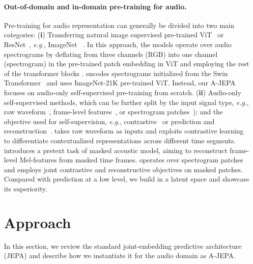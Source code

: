 \documentclass{article}
\begin{document}
\paragraph{Out-of-domain and in-domain pre-training for audio.} 
Pre-training for audio representation can generally be divided into two main categories: 
(\textbf{i}) Transferring natural image supervised pre-trained ViT~\cite{dosovitskiy2020image} or ResNet~\cite{He2015DeepRL}, \emph{e.g.}, ImageNet ~\cite{gong2021ast,paast,Nagrani21c,chen2022hts,gong2021psla,cmkd}. 
In this approach, the models operate over audio spectrograms by deflating from three channels (RGB) into one channel (spectrogram) in the pre-trained patch embedding in ViT and employing the rest of the transformer blocks \cite{gong2021ast,paast}. 
\cite{chen2022hts} encodes spectrograms initialized from the Swin Transformer~\cite{swin} and 
\cite{Nagrani21c} uses ImageNet-21K pre-trained ViT. 
Instead, our A-JEPA focuses on audio-only self-supervised pre-training from scratch. 
(\textbf{ii}) Audio-only self-supervised methods, which can be further split by the input signal type, \emph{e.g.}, raw waveform~\cite{wav2vec,wav2vec2,d2v}, frame-level features~\cite{Hsu2021HuBERTSS,avhubert,srivastava2021conformer}, or spectrogram patches~\cite{ssast,baade2022}); and the objective used for self-supervision, \emph{e.g.}, contrastive~\cite{cpc,wav2vec2,object_sound,stica,Hsu2021HuBERTSS} or prediction and reconstruction~\cite{ssast,d2v,srivastava2021conformer,avhubert}.
\cite{wav2vec2} takes raw waveform as inputs and exploits contrastive learning to differentiate contextualized representations across different time segments.
\cite{mockingjay} introduces a pretext task of masked acoustic model, aiming to reconstruct frame-level Mel-features from masked time frames. 
\cite{ssast,baade2022,chong2022masked,niizumi2022masked,huang2022masked} operates over spectrogram patches and employs joint contrastive and reconstructive objectives on masked patches. 
Compared with prediction at a low level, we build in a latent space and showcase its superiority.








\section{Approach}

In this section, we review the standard joint-embedding predictive architecture (JEPA) and describe how we instantiate it for the audio domain as A-JEPA.
\end{document}
